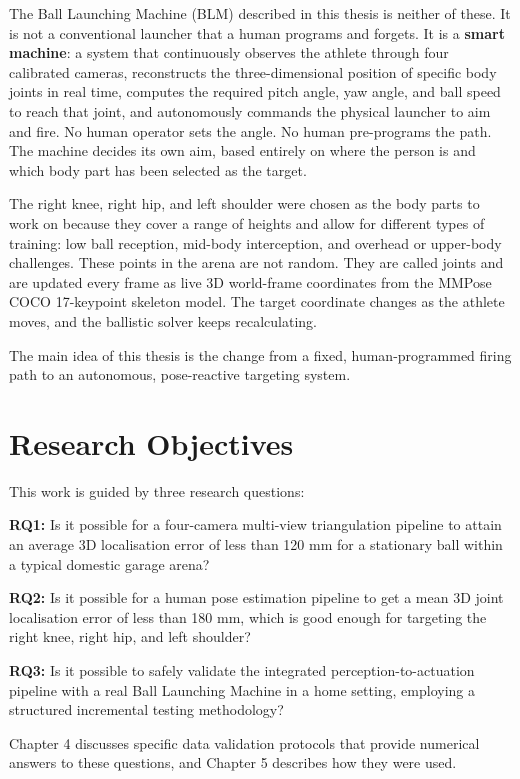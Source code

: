 The Ball Launching Machine (BLM) described in this thesis is neither of these. It is not a conventional launcher that a human programs and forgets. It is a \textbf{smart machine}: a system that continuously observes the athlete through four calibrated cameras, reconstructs the three-dimensional position of specific body joints in real time, computes the required pitch angle, yaw angle, and ball speed to reach that joint, and autonomously commands the physical launcher to aim and fire. No human operator sets the angle. No human pre-programs the path. The machine decides its own aim, based entirely on where the person is and which body part has been selected as the target.

The right knee, right hip, and left shoulder were chosen as the body parts to work on because they cover a range of heights and allow for different types of training: low ball reception, mid-body interception, and overhead or upper-body challenges. These points in the arena are not random. They are called joints and are updated every frame as live 3D world-frame coordinates from the MMPose COCO 17-keypoint skeleton model. The target coordinate changes as the athlete moves, and the ballistic solver keeps recalculating.

The main idea of this thesis is the change from a fixed, human-programmed firing path to an autonomous, pose-reactive targeting system.

\section{Research Objectives}

This work is guided by three research questions:

\textbf{RQ1:} Is it possible for a four-camera multi-view triangulation pipeline to attain an average 3D localisation error of less than 120 mm for a stationary ball within a typical domestic garage arena?

\textbf{RQ2:} Is it possible for a human pose estimation pipeline to get a mean 3D joint localisation error of less than 180 mm, which is good enough for targeting the right knee, right hip, and left shoulder?

\textbf{RQ3:} Is it possible to safely validate the integrated perception-to-actuation pipeline with a real Ball Launching Machine in a home setting, employing a structured incremental testing methodology?

Chapter 4 discusses specific data validation protocols that provide numerical answers to these questions, and Chapter 5 describes how they were used.

